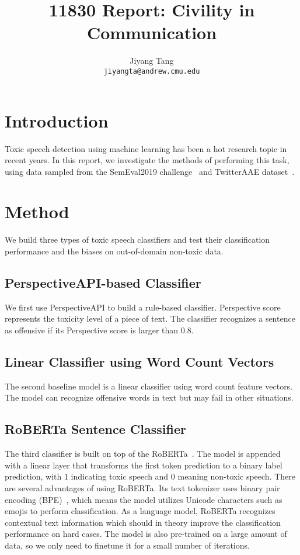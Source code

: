 \documentclass[11pt]{article}
\title{11830 Report: Civility in Communication}
\author{
    Jiyang Tang \\
    \texttt{jiyangta@andrew.cmu.edu}
}
\begin{document}
    \maketitle


    \section{Introduction}

    Toxic speech detection using machine learning has been a hot research topic in recent years.
    In this report, we investigate the methods of performing this task, using data sampled from the SemEval2019
    challenge~\cite{semeval2019} and TwitterAAE dataset~\cite{twitter_aae}.


    \section{Method}

    We build three types of toxic speech classifiers and test their classification performance and the biases
    on out-of-domain non-toxic data.

    \subsection{PerspectiveAPI-based Classifier}

    We first use PerspectiveAPI to build a rule-based classifier.
    Perspective score represents the toxicity level of a piece of text.
    The classifier recognizes a sentence as offensive if its Perspective score is larger than $0.8$.

    \subsection{Linear Classifier using Word Count Vectors}

    The second baseline model is a linear classifier using word count feature vectors.
    The model can recognize offensive words in text but may fail in other situations.

    \subsection{RoBERTa Sentence Classifier}

    The third classifier is built on top of the RoBERTa~\cite{roberta}.
    The model is appended with a linear layer that transforms the first token prediction to a binary label prediction,
    with $1$ indicating toxic speech and $0$ meaning non-toxic speech.
    There are several advantages of using RoBERTa.
    Its text tokenizer uses binary pair encoding (BPE)~\cite{BPE}, which means the model utilizes Unicode characters
    such as emojis to perform classification.
    As a language model, RoBERTa recognizes contextual text information which should in theory improve the
    classification performance on hard cases.
    The model is also pre-trained on a large amount of data, so we only need to finetune it for a small number
    of iterations.
\end{document}
